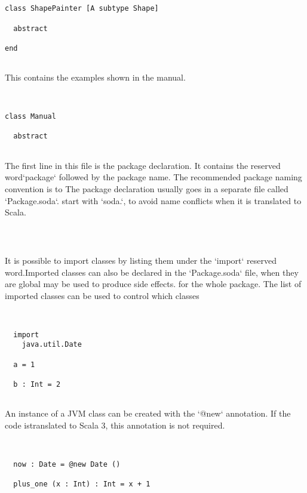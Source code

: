 \documentclass[12pt,a4paper]{article}
\begin{document}
\begin{lstlisting}


class ShapePainter [A subtype Shape]

  abstract

end


\end{lstlisting}

 This contains the examples shown in the manual.


\begin{lstlisting}


class Manual

  abstract


\end{lstlisting}

The first line in this file is the package declaration. It contains the reserved word`package` followed by the package name. The recommended package naming convention is to
The package declaration usually goes in a separate file called `Package.soda`. start with `soda.`, to avoid name conflicts when it is translated to Scala.


\begin{lstlisting}



\end{lstlisting}

It is possible to import classes by listing them under the `import` reserved word.Imported classes can also be declared in the `Package.soda` file, when they are global
may be used to produce side effects. for the whole package. The list of imported classes can be used to control which classes


\begin{lstlisting}


  import
    java.util.Date

  a = 1

  b : Int = 2


\end{lstlisting}

An instance of a JVM class can be created with the `@new` annotation. If the code istranslated to Scala 3, this annotation is not required. 


\begin{lstlisting}


  now : Date = @new Date ()

  plus_one (x : Int) : Int = x + 1


\end{lstlisting}
\end{document}
